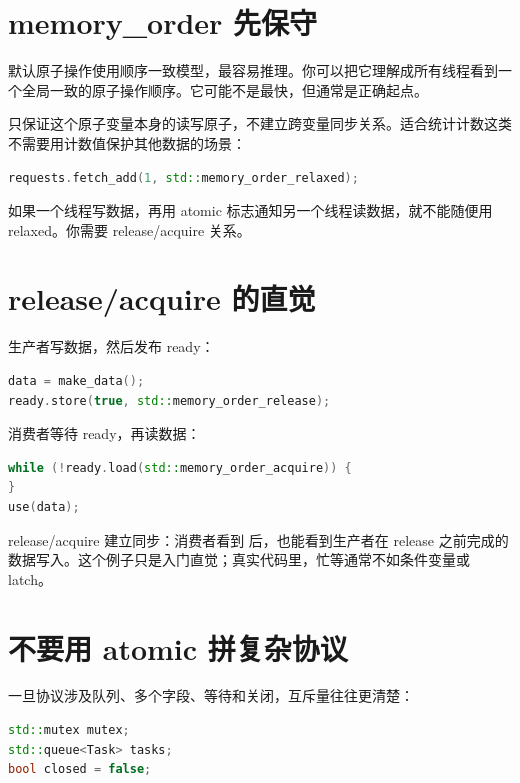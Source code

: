 \section{memory\_order 先保守}

默认原子操作使用顺序一致模型，最容易推理。你可以把它理解成所有线程看到一个全局一致的原子操作顺序。它可能不是最快，但通常是正确起点。

 只保证这个原子变量本身的读写原子，不建立跨变量同步关系。适合统计计数这类不需要用计数值保护其他数据的场景：

\begin{lstlisting}[language=C++,caption={relaxed 适合统计计数}]
requests.fetch_add(1, std::memory_order_relaxed);
\end{lstlisting}

如果一个线程写数据，再用 atomic 标志通知另一个线程读数据，就不能随便用 relaxed。你需要 release/acquire 关系。

\section{release/acquire 的直觉}

生产者写数据，然后发布 ready：

\begin{lstlisting}[language=C++,caption={发布数据}]
data = make_data();
ready.store(true, std::memory_order_release);
\end{lstlisting}

消费者等待 ready，再读数据：

\begin{lstlisting}[language=C++,caption={获取数据}]
while (!ready.load(std::memory_order_acquire)) {
}
use(data);
\end{lstlisting}

release/acquire 建立同步：消费者看到  后，也能看到生产者在 release 之前完成的数据写入。这个例子只是入门直觉；真实代码里，忙等通常不如条件变量或 latch。

\section{不要用 atomic 拼复杂协议}

一旦协议涉及队列、多个字段、等待和关闭，互斥量往往更清楚：

\begin{lstlisting}[language=C++,caption={复杂共享状态优先 mutex}]
std::mutex mutex;
std::queue<Task> tasks;
bool closed = false;
\end{lstlisting}

